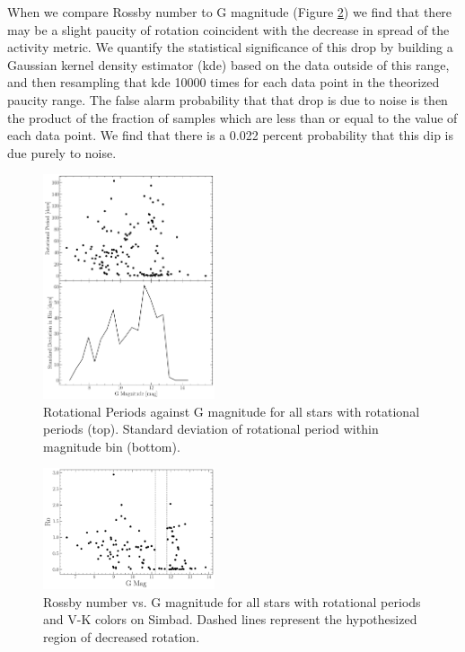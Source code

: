 When we compare Rossby number to G magnitude (Figure \ref{fig:rossby}) we find
that there may be a slight paucity of rotation coincident with the decrease in
spread of the activity metric. We quantify the statistical significance of this
drop by building a Gaussian kernel density estimator (kde) based on the data
outside of this range, and then resampling that kde 10000 times for each data
point in the theorized paucity range. The false alarm probability that that drop
is due to noise is then the product of the fraction of samples which are less
than or equal to the value of each data point. We find that there is a 0.022
percent probability that this dip is due purely to noise.


\begin{figure}
  \centering
  \includegraphics[width=0.45\textwidth]{RotationSignifigance.pdf}
  \caption{Rotational Periods against G magnitude for all stars with rotational
  periods (top). Standard deviation of rotational period within magnitude bin (bottom).}
  \label{fig:rotationalSignifigance}
\end{figure}

\begin{figure}
  \centering
  \includegraphics[width=0.45\textwidth]{Rossby.pdf}
  \caption{Rossby number vs. G magnitude for all stars with rotational periods
  and V-K colors on Simbad. Dashed lines represent the hypothesized region of decreased rotation.}
  \label{fig:rossby}
\end{figure}


